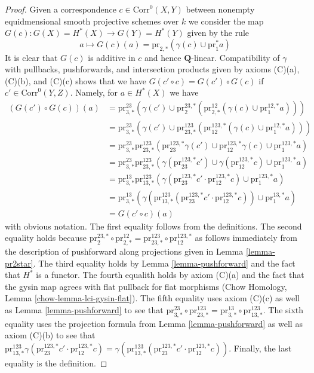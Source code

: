 \begin{proof}
\medskip\noindent
Given a correspondence $c \in \text{Corr}^0(X, Y)$ between
nonempty equidmensional smooth projective schemes over $k$
we consider the map $G(c) : G(X) = H^*(X) \to G(Y) = H^*(Y)$
given by the rule
$$
a \longmapsto
G(c)(a) = \text{pr}_{2, *}(\gamma(c) \cup \text{pr}_1^*a)
$$
It is clear that $G(c)$ is additive in $c$ and hence $\mathbf{Q}$-linear.
Compatibility of $\gamma$ with pullbacks, pushforwards, and
intersection products given by axioms (C)(a), (C)(b), and (C)(c)
shows that we have
$G(c' \circ c) = G(c') \circ G(c)$ if $c' \in \text{Corr}^0(Y, Z)$.
Namely, for $a \in H^*(X)$ we have
\begin{align*}
(G(c') \circ G(c))(a)
& =
\text{pr}^{23}_{3, *}(\gamma(c') \cup
\text{pr}^{23, *}_2(\text{pr}^{12}_{2, *}(\gamma(c) \cup
\text{pr}^{12, *}_1a))) \\
& =
\text{pr}^{23}_{3, *}(\gamma(c') \cup
\text{pr}^{123}_{23, *}(\text{pr}^{123, *}_{12}(\gamma(c) \cup
\text{pr}^{12, *}_1 a))) \\
& =
\text{pr}^{23}_{3, *}
\text{pr}^{123}_{23, *}(
\text{pr}^{123, *}_{23}\gamma(c') \cup
\text{pr}^{123, *}_{12}\gamma(c) \cup
\text{pr}^{123, *}_1 a) \\
& =
\text{pr}^{23}_{3, *}
\text{pr}^{123}_{23, *}(
\gamma(\text{pr}^{123, *}_{23}c') \cup
\gamma(\text{pr}^{123, *}_{12}c) \cup
\text{pr}^{123, *}_1 a) \\
& =
\text{pr}^{13}_{3, *}
\text{pr}^{123}_{13, *}(
\gamma(\text{pr}^{123, *}_{23}c' \cdot \text{pr}^{123, *}_{12}c) \cup
\text{pr}^{123, *}_1 a) \\
& =
\text{pr}^{13}_{3, *}(
\gamma(\text{pr}^{123}_{13, *}(\text{pr}^{123, *}_{23}c' \cdot
\text{pr}^{123, *}_{12}c)) \cup
\text{pr}^{13, *}_1 a) \\
& =
G(c' \circ c)(a)
\end{align*}
with obvious notation. The first equality follows from the definitions.
The second equality holds because
$\text{pr}^{23, *}_2 \circ \text{pr}^{12}_{2, *} =
\text{pr}^{123}_{23, *} \circ \text{pr}^{123, *}_{12}$
as follows immediately from the description of pushforward
along projections given in Lemma \ref{lemma-pr2star}.
The third equality holds by Lemma \ref{lemma-pushforward}
and the fact that $H^*$ is a functor.
The fourth equalith holds by axiom (C)(a) and the fact that
the gysin map agrees with flat pullback for flat morphisms
(Chow Homology, Lemma \ref{chow-lemma-lci-gysin-flat}).
The fifth equality uses axiom (C)(c) as well as
Lemma \ref{lemma-pushforward} to see that
$\text{pr}^{23}_{3, *} \circ \text{pr}^{123}_{23, *} =
\text{pr}^{13}_{3, *} \circ \text{pr}^{123}_{13, *}$.
The sixth equality uses the projection formula from
Lemma \ref{lemma-pushforward} as well as
axiom (C)(b) to see that $
\text{pr}^{123}_{13, *}
\gamma(\text{pr}^{123, *}_{23}c' \cdot \text{pr}^{123, *}_{12}c) =
\gamma(\text{pr}^{123}_{13, *}(
\text{pr}^{123, *}_{23}c' \cdot \text{pr}^{123, *}_{12}c))$.
Finally, the last equality is the definition.


\end{proof}
